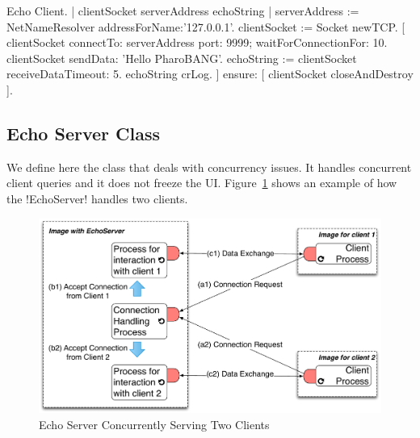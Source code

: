 \documentclass[a4paper,10pt,twoside]{book}
\begin{document}
\begin{script}[echoClient]{Echo Client.}
| clientSocket serverAddress echoString |
serverAddress := NetNameResolver addressForName:'127.0.0.1'.
clientSocket := Socket newTCP.
[ clientSocket 
	connectTo: serverAddress port: 9999;
	waitForConnectionFor: 10.
 clientSocket sendData: 'Hello PharoBANG'.
 echoString  := clientSocket receiveDataTimeout: 5.
 echoString crLog.
] ensure: [ clientSocket closeAndDestroy ].
\end{script}
%

\subsection{Echo Server Class}\label{sec:echoServerClass}
We define here the  class that deals with concurrency issues.
It handles concurrent client queries and it does not freeze the UI.
Figure~\ref{fig:echoServerConcurrency} shows an example of how the \ct!EchoServer! handles two clients. 

\begin{figure}[ht]\centering
	\includegraphics[width=.75\linewidth]{echoServerConcurrency}
	\caption{Echo Server Concurrently Serving Two Clients}
	\label{fig:echoServerConcurrency}
\end{figure}
\end{document}
